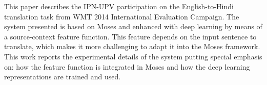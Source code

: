 This paper describes the IPN-UPV participation on the English-to-Hindi translation task from WMT 2014 International Evaluation Campaign. The system presented is based on Moses and enhanced with deep learning by means of a source-context feature function. This feature depends on the input sentence to translate, which makes it more challenging to adapt it into the Moses framework. This work reports the experimental details of the system putting special emphasis on: how the feature function is integrated in Moses and how the deep learning representations are trained and used.
